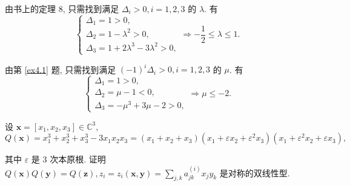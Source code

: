 \documentclass{ctexart}
\begin{document}
\begin{solution}
    由书上的定理 8, 只需找到满足 $\Delta_i>0,i=1,2,3$ 的 $\lambda$. 有
    \[\begin{cases}
        \Delta_1=1>0, \\
        \Delta_2=1-\lambda^2>0, \\
        \Delta_3=1+2\lambda^3-3\lambda^2>0,
    \end{cases}\Rightarrow-\dfrac{1}{2}\leq\lambda\leq1.\]

    由第 \ref{ex4.1} 题, 只需找到满足 $(-1)^i\Delta_i>0,i=1,2,3$ 的 $\mu$. 有
    \[\begin{cases}
        \Delta_1=1>0, \\
        \Delta_2=\mu-1<0, \\
        \Delta_3=-\mu^3+3\mu-2>0,
    \end{cases}\Rightarrow\mu\leq-2.\]
\end{solution}
\begin{exercise}%
    设 $\boldsymbol{x}=[x_1,x_2,x_3]\in\mathbb{C}^3$,
    \[Q(\boldsymbol{x})=x_1^3+x_2^3+x_3^3-3x_1x_2x_3=(x_1+x_2+x_3)(x_1+\varepsilon x_2+\varepsilon^2x_3)(x_1+\varepsilon^2x_2+\varepsilon x_3),\]

    其中 $\varepsilon$ 是 $3$ 次本原根. 证明 $Q(\boldsymbol{x})Q(\boldsymbol{y})=Q(\boldsymbol{z}),z_i=z_i(\boldsymbol{x},\boldsymbol{y})=\sum_{j,k}a^{(i)}_{jk}x_jy_k$ 是对称的双线性型.
\end{exercise}
\end{document}
